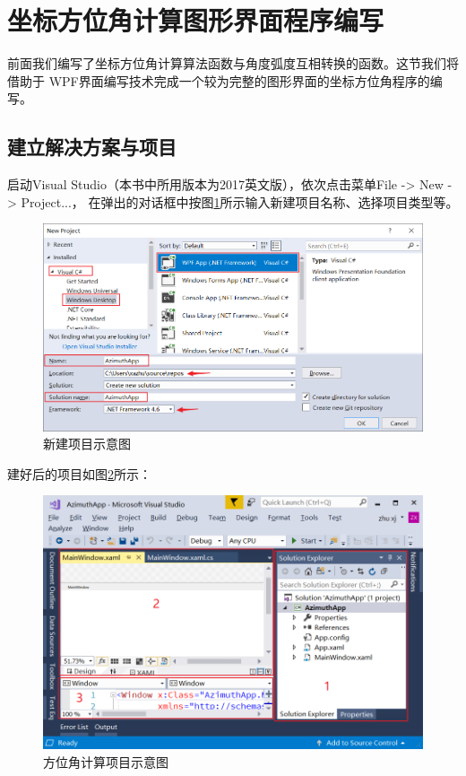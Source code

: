 \section{坐标方位角计算图形界面程序编写}

前面我们编写了坐标方位角计算算法函数与角度弧度互相转换的函数。这节我们将借助于
WPF界面编写技术完成一个较为完整的图形界面的坐标方位角程序的编写。

\subsection{建立解决方案与项目}
启动Visual Studio（本书中所用版本为2017英文版），依次点击菜单File -> New -> Project...，
在弹出的对话框中按图\ref{fig:AzimuthApp1}所示输入新建项目名称、选择项目类型等。

\begin{figure}[htbp]
    \centering
    \includegraphics[scale=0.6]{chapter/surveybase/AzimuthApp1.png}
    \caption{新建项目示意图}
    \label{fig:AzimuthApp1}
\end{figure}

建好后的项目如图\ref{fig:AzimuthApp2}所示：

\begin{figure}[htbp]
    \centering
    \includegraphics[scale=0.6]{chapter/surveybase/AzimuthApp2.png}
    \caption{方位角计算项目示意图}
    \label{fig:AzimuthApp2}
\end{figure}

